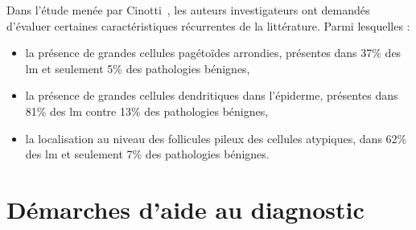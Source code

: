Dans l'étude menée par Cinotti~\cite{Cinotti2018}, les auteurs investigateurs ont demandés d'évaluer certaines caractéristiques récurrentes de la littérature. Parmi lesquelles :
\begin{itemize}
    \item la présence de grandes cellules pagétoïdes arrondies, présentes dans 37\% des \gls{lm} et seulement 5\% des pathologies bénignes,
    \item la présence de grandes cellules dendritiques dans l'épiderme, présentes dans 81\% des \gls{lm} contre 13\% des pathologies bénignes,
    \item la localisation au niveau des follicules pileux des cellules atypiques, dans 62\% des \gls{lm} et seulement 7\% des pathologies bénignes.
\end{itemize}\par

\section{Démarches d'aide au diagnostic}
\label{sec:cad_methods}

\cite{Wiltgen2008}
\cite{Halimi2017a}



